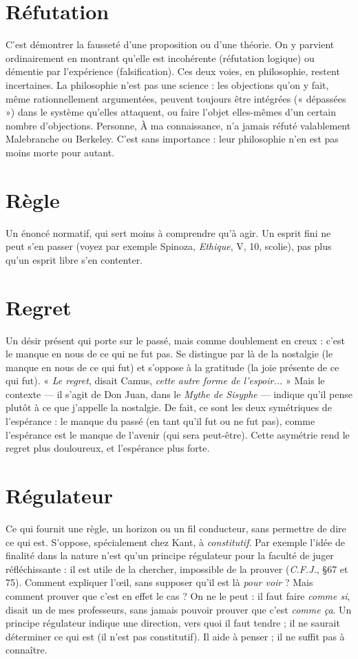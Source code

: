 \section{Réfutation}
C'est démontrer la fausseté d’une proposition ou d’une
théorie. On y parvient ordinairement en montrant qu’elle
est incohérente (réfutation logique) ou démentie par l'expérience (falsification).
Ces deux voies, en philosophie, restent incertaines. La philosophie n’est pas
une science : les objections qu’on y fait, même rationnellement argumentées,
peuvent toujours être intégrées (« dépassées ») dans le système qu’elles attaquent,
ou faire l’objet elles-mêmes d’un certain nombre d’objections. Personne,
À ma connaissance, n’a jamais réfuté valablement Malebranche ou Berkeley.
C’est sans importance : leur philosophie n’en est pas moins morte pour autant.

\section{Règle}
Un énoncé normatif, qui sert moins à comprendre qu’à agir. Un
esprit fini ne peut s’en passer (voyez par exemple Spinoza, {\it Ethique},
V, 10, scolie), pas plus qu’un esprit libre s’en contenter.

\section{Regret}
Un désir présent qui porte sur le passé, mais comme doublement
en creux : c’est le manque en nous de ce qui ne fut pas. Se distingue
par là de la nostalgie (le manque en nous de ce qui fut) et s'oppose à la
gratitude (la joie présente de ce qui fut). « {\it Le regret}, disait Camus, {\it cette autre
forme de l'espoir...} » Mais le contexte — il s’agit de Don Juan, dans le {\it Mythe de
Sisyphe} — indique qu’il pense plutôt à ce que j'appelle la nostalgie. De fait, ce
sont les deux symétriques de l’espérance : le manque du passé (en tant qu’il fut
ou ne fut pas), comme l’espérance est le manque de l'avenir (qui sera peut-être).
Cette asymétrie rend le regret plus douloureux, et l’espérance plus forte.

\section{Régulateur}
Ce qui fournit une règle, un horizon ou un fil conducteur,
sans permettre de dire ce qui est. S’oppose, spécialement
chez Kant, à {\it constitutif}. Par exemple l’idée de finalité dans la nature n’est qu’un
principe régulateur pour la faculté de juger réfléchissante : il est utile de la chercher,
impossible de la prouver ({\it C.F.J.}, \S 67 et 75). Comment expliquer l'œil,
sans supposer qu'il est là {\it pour voir} ? Mais comment prouver que c’est en effet
le cas ? On ne le peut : il faut faire {\it comme si}, disait un de mes professeurs, sans
jamais pouvoir prouver que c’est {\it comme ça}. Un principe régulateur indique une
direction, vers quoi il faut tendre ; il ne saurait déterminer ce qui est (il n’est
pas constitutif). Il aide à penser ; il ne suffit pas à connaître.

